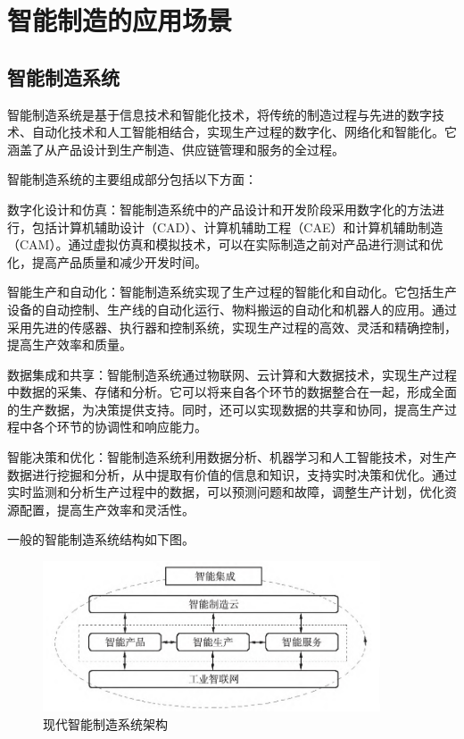 \documentclass[lang=cn,12pt,bibtex,newtx,twoside,margintrue,citestyle=gb7714-2015, bibstyle=gb7714-2015]{elegantbook}
\begin{document}
\section{智能制造的应用场景}
\label{sec:org125382e}
\subsection{智能制造系统}
\label{sec:orgeee4a75}
智能制造系统是基于信息技术和智能化技术，将传统的制造过程与先进的数字技术、自动化技术和人工智能相结合，实现生产过程的数字化、网络化和智能化。它涵盖了从产品设计到生产制造、供应链管理和服务的全过程。

智能制造系统的主要组成部分包括以下方面：

数字化设计和仿真：智能制造系统中的产品设计和开发阶段采用数字化的方法进行，包括计算机辅助设计（CAD）、计算机辅助工程（CAE）和计算机辅助制造（CAM）。通过虚拟仿真和模拟技术，可以在实际制造之前对产品进行测试和优化，提高产品质量和减少开发时间。

智能生产和自动化：智能制造系统实现了生产过程的智能化和自动化。它包括生产设备的自动控制、生产线的自动化运行、物料搬运的自动化和机器人的应用。通过采用先进的传感器、执行器和控制系统，实现生产过程的高效、灵活和精确控制，提高生产效率和质量。

数据集成和共享：智能制造系统通过物联网、云计算和大数据技术，实现生产过程中数据的采集、存储和分析。它可以将来自各个环节的数据整合在一起，形成全面的生产数据，为决策提供支持。同时，还可以实现数据的共享和协同，提高生产过程中各个环节的协调性和响应能力。

智能决策和优化：智能制造系统利用数据分析、机器学习和人工智能技术，对生产数据进行挖掘和分析，从中提取有价值的信息和知识，支持实时决策和优化。通过实时监测和分析生产过程中的数据，可以预测问题和故障，调整生产计划，优化资源配置，提高生产效率和灵活性。

一般的智能制造系统结构如下图。
\begin{figure}[htbp]
\centering
\includegraphics[angle=0,width=10cm]{./figure/3.1.png}
\caption{\label{3.1}现代智能制造系统架构}
\end{figure}
\end{document}
